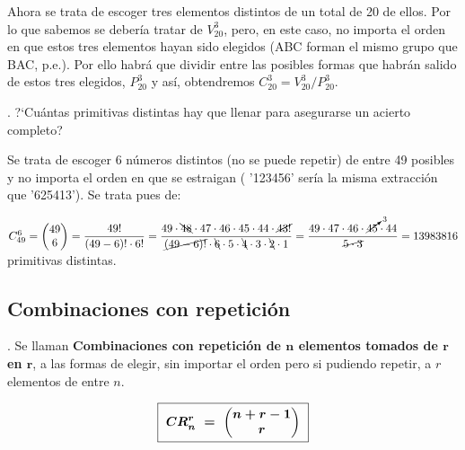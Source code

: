 	\begin{small} Ahora se trata de escoger tres elementos distintos de un total de 20 de ellos. Por lo que sabemos se debería tratar de $V_{20}^3$, pero, en este caso, no importa el orden en que estos tres elementos hayan sido elegidos \textcolor{gris}{(ABC forman el mismo grupo que BAC, p.e.)}. Por ello habrá que dividir entre las posibles formas que habrán salido de estos tres elegidos, $P_{20}^3$ y así, obtendremos $C_{20}^3=V_{20}^3 / P_{20}^3$. \end{small}

\begin{example}
	. ?`Cuántas primitivas distintas hay que llenar para asegurarse un acierto completo?
	
	\vspace{4mm} Se trata de escoger 6 números distintos (no se puede repetir) de entre 49 posibles y no importa el orden en que se estraigan ( '123456' sería la misma extracción que '625413'). Se trata pues de:
	
	\vspace{2mm} $C_{49}^6=\mqty(49\\6)=\dfrac{49!}{(49-6)!\cdot 6!}=\dfrac{49\cdot \bcancel{48} \cdot 47 \cdot 46 \cdot 45 \cdot 44 \cdot \cancel{43!}}{\cancel{(49-6)!} \cdot \bcancel{6} \cdot 5\cdot \bcancel{4} \cdot 3 \cdot \bcancel{2} \cdot 1} 	= \dfrac{49 \cdot 47 \cdot 46 \cdot \cancelto{3}{45} \cdot 44}{\cancel{5 \cdot 3}}=13983816$ primitivas distintas.
\end{example}

\subsection{Combinaciones con repetición}

\begin{definition}
	. Se llaman \textbf{Combinaciones con repetición de $\boldsymbol{n}$ elementos tomados de $\boldsymbol{r}$ en $\boldsymbol{r}$}, a las formas de elegir, sin importar el orden pero si pudiendo repetir, a $r$ elementos de entre $n$.
	
	$$\boxed{ \ \boldsymbol{ CR_n^r \ = \ \mqty(n+r-1\\r) } \ }$$	
\end{definition}


